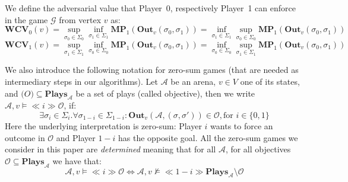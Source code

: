 We define the adversarial value that Player~0, respectively Player~1 can enforce in the game $\mathcal{G}$ from vertex $v$ as:
\begin{equation*}
    \mathbf{WCV}_0(v) = \sup\limits_{\sigma_0 \in \Sigma_0} \inf\limits_{\sigma_1 \in \Sigma_1} \mathbf{MP}_1(\mathbf{Out}_v(\sigma_0,\sigma_1)) = \inf\limits_{\sigma_1 \in \Sigma_1} \sup\limits_{\sigma_0 \in \Sigma_0} \mathbf{MP}_1(\mathbf{Out}_v(\sigma_0,\sigma_1))
\end{equation*}
\begin{equation*}
    \mathbf{WCV}_1(v) = \sup\limits_{\sigma_1 \in \Sigma_1} \inf\limits_{\sigma_0 \in \Sigma_0} \mathbf{MP}_1(\mathbf{Out}_v(\sigma_0,\sigma_1)) = \inf\limits_{\sigma_0 \in \Sigma_0} \sup\limits_{\sigma_1 \in \Sigma_1} \mathbf{MP}_1(\mathbf{Out}_v(\sigma_0,\sigma_1))
\end{equation*}

We also introduce the following notation for zero-sum games (that are needed as intermediary steps in our algorithms). Let $\mathcal{A}$ be an arena, $v \in V$ one of its states, and $\mathcal(O) \subseteq \mathbf{Plays}_{\mathcal{A}}$ be a set of plays (called objective), then we write $ \mathcal{A}, v \models \ll i \gg \mathcal{O}$, if:
\begin{equation*}
    \exists \sigma_i\in \Sigma_i . \forall \sigma_{1-i} \in \Sigma_{1-i}: \mathbf{Out}_v(\mathcal{A}, (\sigma, \sigma')) \in \mathcal{O}, \text{for } i \in \{0,1\}
\end{equation*}
Here the underlying interpretation is zero-sum: Player $i$ wants to force an outcome in $\mathcal{O}$ and Player $1-i$ has the opposite goal. All the zero-sum games we consider in this paper are \textit{determined} meaning that for all $\mathcal{A}$, for all objectives $\mathcal{O} \subseteq \mathbf{Plays}_{\mathcal{A}}$ we have that:
\begin{equation*}
    \mathcal{A}, v \models \ll i \gg \mathcal{O} \iff \mathcal{A}, v \nvDash \ll 1-i \gg \mathbf{Plays}_{\mathcal{A}} \setminus \mathcal{O}
\end{equation*}


